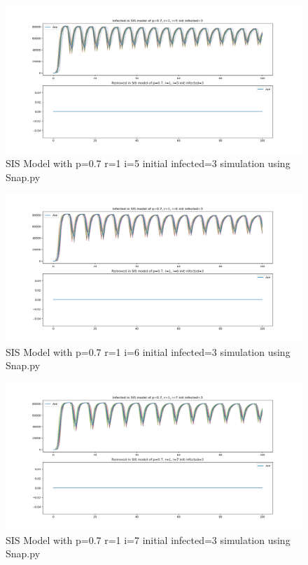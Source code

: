 \documentclass{subfile}
\begin{document}
  \begin{figure}
  \includegraphics[scale=0.8]{sisp07r1i5s3}
  \caption[SIS p=0.7,r=1,i=5,init infected=3]{SIS Model with p=0.7 r=1 i=5 initial infected=3 simulation using Snap.py}
  \end{figure}
  \begin{figure}
  \includegraphics[scale=0.8]{sisp07r1i6s3}
  \caption[SIS p=0.7,r=1,i=6,init infected=3]{SIS Model with p=0.7 r=1 i=6 initial infected=3 simulation using Snap.py}
  \end{figure}
  \begin{figure}
  \includegraphics[scale=0.8]{sisp07r1i7s3}
  \caption[SIS p=0.7,r=1,i=7,init infected=3]{SIS Model with p=0.7 r=1 i=7 initial infected=3 simulation using Snap.py}
  \end{figure}
\end{document}
